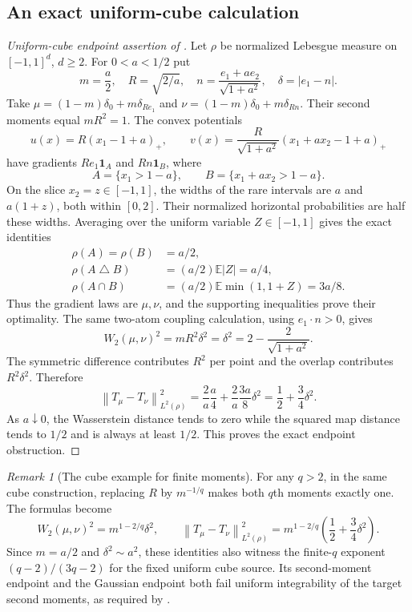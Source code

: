 \documentclass[11pt]{article}
\numberwithin{equation}{section}
\theoremstyle{remark}
\newtheorem{remark}[theorem]{Remark}
\newcommand{\E}{\mathbb E}
\newcommand{\ind}{\mathbf 1}
\newcommand{\norm}[1]{\left\lVert #1\right\rVert}
\begin{document}
\subsection{An exact uniform-cube calculation}
\begin{proof}[Uniform-cube endpoint assertion of ]
Let $\rho$ be normalized Lebesgue measure on $[-1,1]^d$, $d\ge2$. For $0<a<1/2$ put
\[
 m=\frac a2,\quad R=\sqrt{2/a},\quad
 n=\frac{e_1+a e_2}{\sqrt{1+a^2}},\quad \delta=|e_1-n|.
\]
Take $\mu=(1-m)\delta_0+m\delta_{Re_1}$ and $\nu=(1-m)\delta_0+m\delta_{Rn}$. Their second moments equal $mR^2=1$. The convex potentials
\[
 u(x)=R(x_1-1+a)_+,\qquad
 v(x)=\frac R{\sqrt{1+a^2}}(x_1+a x_2-1+a)_+
\]
have gradients $Re_1\ind_A$ and $Rn\ind_B$, where
\[
 A=\{x_1>1-a\},\qquad B=\{x_1+a x_2>1-a\}.
\]
On the slice $x_2=z\in[-1,1]$, the widths of the rare intervals are $a$ and $a(1+z)$, both within $[0,2]$. Their normalized horizontal probabilities are half these widths. Averaging over the uniform variable $Z\in[-1,1]$ gives the exact identities
\begin{align*}
 \rho(A)=\rho(B)&=a/2,\\
 \rho(A\mathbin\triangle B)&=(a/2)\E|Z|=a/4,\\
 \rho(A\cap B)&=(a/2)\E\min(1,1+Z)=3a/8.
\end{align*}
Thus the gradient laws are $\mu,\nu$, and the supporting inequalities prove their optimality. The same two-atom coupling calculation, using $e_1\cdot n>0$, gives
\begin{equation}\label{eq:cube-endpoint-W}
 W_2(\mu,\nu)^2=mR^2\delta^2
 =\delta^2=2-\frac2{\sqrt{1+a^2}}.
\end{equation}
The symmetric difference contributes $R^2$ per point and the overlap contributes $R^2\delta^2$. Therefore
\begin{equation}\label{eq:cube-endpoint-map}
 \norm{T_\mu-T_\nu}_{L^2(\rho)}^2
 =\frac2a\frac a4+\frac2a\frac{3a}8\delta^2
 =\frac12+\frac34\delta^2.
\end{equation}
As $a\downarrow0$, the Wasserstein distance tends to zero while the squared map distance tends to $1/2$ and is always at least $1/2$. This proves the exact endpoint obstruction.
\end{proof}

\begin{remark}[The cube example for finite moments]
For any $q>2$, in the same cube construction, replacing $R$ by $m^{-1/q}$ makes both $q$th moments exactly one. The formulas become
\[
 W_2(\mu,\nu)^2=m^{1-2/q}\delta^2,\qquad
 \norm{T_\mu-T_\nu}_{L^2(\rho)}^2
 =m^{1-2/q}\left(\frac12+\frac34\delta^2\right).
\]
Since $m=a/2$ and $\delta^2\sim a^2$, these identities also witness the finite-$q$ exponent $(q-2)/(3q-2)$ for the fixed uniform cube source. Its second-moment endpoint and the Gaussian endpoint both fail uniform integrability of the target second moments, as required by .
\end{remark}
\end{document}

